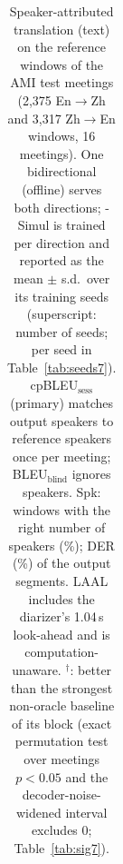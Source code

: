 \begin{table}[t]
{\begin{tabular}{lccccc@{\hskip 10pt}ccccc}
\bottomrule
\end{tabular}}
\caption{Speaker-attributed translation (text) on the reference windows of the AMI test meetings (2{,}375 En$\rightarrow$Zh and 3{,}317 Zh$\rightarrow$En windows, 16 meetings). One bidirectional \sys{} (offline) serves both directions; \sys{}-Simul is trained per direction and reported as the mean $\pm$ s.d.\ over its training seeds (superscript: number of seeds; per seed in Table~\ref{tab:seeds7}). cpBLEU$_\text{sess}$ (primary) matches output speakers to reference speakers once per meeting; BLEU$_\text{blind}$ ignores speakers. Spk: windows with the right number of speakers (\%); DER (\%) of the output segments. LAAL includes the diarizer's 1.04\,s look-ahead and is computation-unaware. $^\dagger$: better than the strongest non-oracle baseline of its block (exact permutation test over meetings $p<0.05$ and the decoder-noise-widened interval excludes 0; Table~\ref{tab:sig7}).}
\label{tab:main7full}
\end{table}
